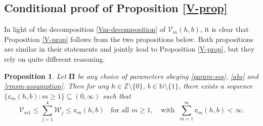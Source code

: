 \documentclass[12pt, twoside]{article}
\newtheorem{proposition}[theorem]{Proposition}
\theoremstyle{definition}
\numberwithin{equation}{section}
\begin{document}
\subsection{Conditional proof of Proposition \ref{V-prop}}  \label{Vprop-proof-section-part1} 
In light of the decomposition \eqref{Vm-decomposition} of $\mathcal V_m(h,b)$, it is clear that Proposition \ref{V-prop} follows from the two propositions below. Both propositions are similar in their statements and jointly lead to Proposition \ref{V-prop}, but they rely on quite different reasoning. 
\begin{proposition} \label{W-sum-prop}
Let $\pmb{\Pi}$ be any choice of parameters obeying \eqref{param-seq}, \eqref{abs} and \eqref{rmsm-assumption}. Then for any $h \in \mathbb Z \setminus \{0\}$, $b \in \mathbb N \setminus \{1\}$, there exists a sequence $\{\mathtt c_m(h, b) : m \geq 1\} \subseteq (0, \infty)$ such that   
 \begin{equation} \label{W-sum-estimate}
 \mathcal V_{m1} \leq \sum_{j=1}^{4} \mathcal W_j \leq \mathtt c_m(h, b) \; \; \text{ for all } m \geq 1, \quad\text{with}\; \;  \sum_{m=1}^{\infty} \mathtt c_m(h, b) < \infty. 
 \end{equation} 
\end{proposition} 
\end{document}
